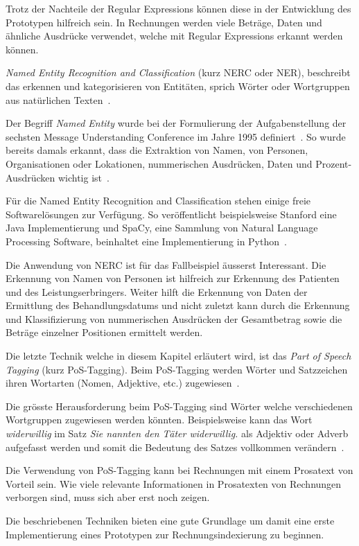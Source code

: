 Trotz der Nachteile der Regular Expressions können diese in der Entwicklung des Prototypen hilfreich sein. In Rechnungen werden viele Beträge, Daten und ähnliche Ausdrücke verwendet, welche mit Regular Expressions erkannt werden können.

\textit{Named Entity Recognition and Classification} (kurz NERC oder NER), beschreibt das erkennen und kategorisieren von Entitäten, sprich Wörter oder Wortgruppen aus natürlichen Texten~\autocite{Nadeau2007}.

Der Begriff \textit{Named Entity} wurde bei der Formulierung der Aufgabenstellung der sechsten Message Understanding Conference im Jahre 1995 definiert~\autocite{Borthwick1998}. So wurde bereits damals erkannt, dass die Extraktion von Namen, von Personen, Organisationen oder Lokationen, nummerischen Ausdrücken, Daten und Prozent-Ausdrücken wichtig ist~\autocite{Nadeau2007}.

Für die Named Entity Recognition and Classification stehen einige freie Softwarelösungen zur Verfügung. So veröffentlicht beispielsweise Stanford eine Java Implementierung und SpaCy, eine Sammlung von Natural Language Processing Software, beinhaltet eine Implementierung in Python~\autocite{StanfordNLPGroup, ExplosionAI}.

Die Anwendung von NERC ist für das Fallbeispiel äusserst Interessant. Die Erkennung von Namen von Personen ist hilfreich zur Erkennung des Patienten und des Leistungserbringers. Weiter hilft die Erkennung von Daten der Ermittlung des Behandlungsdatums und nicht zuletzt kann durch die Erkennung und Klassifizierung von nummerischen Ausdrücken der Gesamtbetrag sowie die Beträge einzelner Positionen ermittelt werden.

Die letzte Technik welche in diesem Kapitel erläutert wird, ist das \textit{Part of Speech Tagging} (kurz PoS-Tagging). Beim PoS-Tagging werden Wörter und Satzzeichen ihren Wortarten (Nomen, Adjektive, etc.) zugewiesen~\autocite{Xiao2004}.

Die grösste Herausforderung beim PoS-Tagging sind Wörter welche verschiedenen Wortgruppen zugewiesen werden könnten. Beispielsweise kann das Wort \textit{widerwillig} im Satz \textit{Sie nannten den Täter widerwillig.} als Adjektiv oder Adverb aufgefasst werden und somit die Bedeutung des Satzes vollkommen verändern~\autocite{Volk}.


Die Verwendung von PoS-Tagging kann bei Rechnungen mit einem Prosatext von Vorteil sein. Wie viele relevante Informationen in Prosatexten von Rechnungen verborgen sind, muss sich aber erst noch zeigen.

Die beschriebenen Techniken bieten eine gute Grundlage um damit eine erste Implementierung eines Prototypen zur Rechnungsindexierung zu beginnen.

